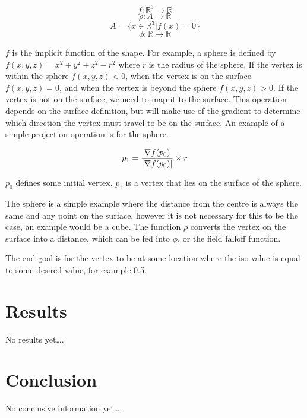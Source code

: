 \documentclass[conference]{acmsiggraph}
\begin{document}
$$f : \mathbb{R}^3 \rightarrow \mathbb{R}$$
$$\rho : A \rightarrow \mathbb{R} $$
$$A = \{x \in \mathbb{R}^3 | f(x) = 0\}$$
$$\phi : \mathbb{R} \rightarrow \mathbb{R}$$

$f$ is the implicit function of the shape. For example, a sphere is defined by
$f(x, y, z) = x^2 + y ^ 2 + z ^ 2 - r^2$ where $r$ is the radius of the sphere.
If the vertex is within the sphere $f(x, y, z) < 0$, when the vertex is on the
surface $f(x, y, z) = 0$, and when the vertex is beyond the sphere $f(x, y, z)
> 0$. If the vertex is not on the surface, we need to map it to the surface.
This operation depends on the surface definition, but will make use of the
gradient to determine which direction the vertex must travel to be on the
surface. An example of a simple projection operation is for the sphere.

$$p_1 = {\nabla f(p_0) \over |\nabla f(p_0)|} \times r$$

$p_0$ defines some initial vertex. $p_1$ is a vertex that lies on the surface
of the sphere.

The sphere is a simple example where the distance from the centre is always the
same and any point on the surface, however it is not necessary for this to be
the case, an example would be a cube. The function $\rho$ converts the vertex
on the surface into a distance, which can be fed into $\phi$, or the field
falloff function.

The end goal is for the vertex to be at some location where the iso-value is
equal to some desired value, for example 0.5.


\section{Results}
No results yet\ldots.


\section{Conclusion}
No conclusive information yet\ldots.




\end{document}
